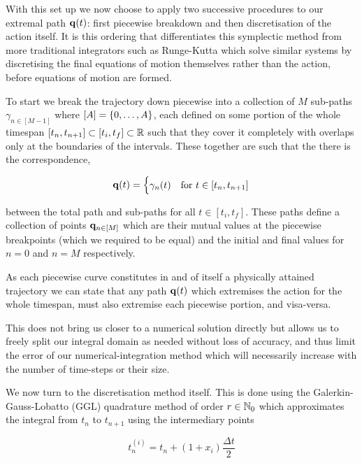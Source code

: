 With this set up we now choose to apply two successive procedures to our extremal path $\vb q(t)$: first piecewise breakdown and then discretisation of the action itself. It is this ordering that differentiates this symplectic method from more traditional integrators such as Runge-Kutta \cite{devriesFirstCourseComputational2011} which solve similar systems by discretising the final equations of motion themselves rather than the action, before equations of motion are formed.

To start we break the trajectory down piecewise into a collection of $M$ sub-paths $\gamma_{n \in [M - 1]}$ where $[A] = \left\{0, \dots, A\right\}$, each defined on some portion of the whole timespan $[t_n, t_{n + 1}] \subset [t_i, t_f] \subset \mathbb{R}$ such that they cover it completely with overlaps only at the boundaries of the intervals. These together are such that the there is the correspondence,

\begin{equation}
\label{eq:pw-traj}
	\vb q(t) = \begin{cases}
		\gamma_n(t) &\text{for~} t \in [t_n, t_{n + 1}]
	\end{cases}
\end{equation}

between the total path and sub-paths for all $t \in [t_i, t_f]$. These paths define a collection of points $\vb q_{n \in [M]}$ which are their mutual values at the piecewise breakpoints (which we required to be equal) and the initial and final values for $n = 0$ and $n = M$ respectively.

As each piecewise curve constitutes in and of itself a physically attained trajectory we can state that any path $\vb{q}(t)$ which extremises the action for the whole timespan, must also extremise each piecewise portion, and visa-versa. 

This does not bring us closer to a numerical solution directly but allows us to freely split our integral domain as needed without loss of accuracy, and thus limit the error of our numerical-integration method which will necessarily increase with the number of time-steps or their size.

We now turn to the discretisation method itself. This is done using the Galerkin-Gauss-Lobatto (GGL) quadrature method of order $r \in \mathbb{N}_0$\cite{tsangSLIMPLECTICINTEGRATORSVARIATIONAL2015, farrVariationalIntegratorsGravitational2007} which approximates the integral from $t_n$ to $t_{n + 1}$ using the intermediary points

\begin{equation}
  t^{(i)}_n = t_n + (1 + x_i)\frac{\Delta t}{2}
\end{equation}

